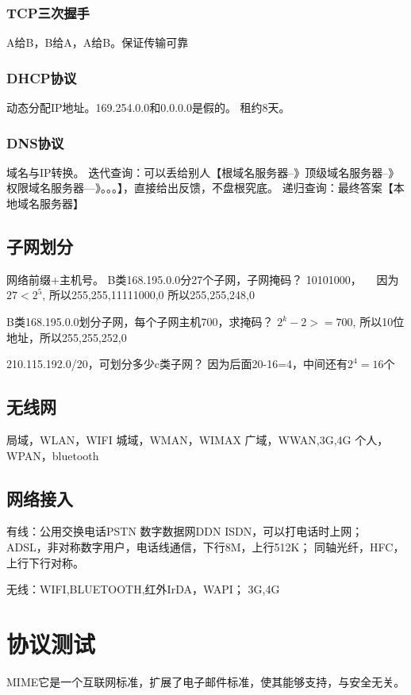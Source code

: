 \documentclass[UTF8]{../computerUniverse}
\begin{document}
\subsubsection{TCP三次握手}
A给B，B给A，A给B。保证传输可靠

\subsubsection{DHCP协议}
动态分配IP地址。169.254.0.0和0.0.0.0是假的。
租约8天。
\subsubsection{DNS协议}
域名与IP转换。
迭代查询：可以丢给别人【根域名服务器--》顶级域名服务器--》权限域名服务器---》。。。】，直接给出反馈，不盘根究底。
递归查询：最终答案【本地域名服务器】


\subsection{子网划分}
网络前缀+主机号。
B类168.195.0.0分27个子网，子网掩码？
10101000，~~
因为$27<2^5$,
所以255,255,11111000,0
所以255,255,248,0

B类168.195.0.0划分子网，每个子网主机700，求掩码？
$2^k-2>=700$, 所以10位地址，所以255,255,252,0


210.115.192.0/20，可划分多少c类子网？
因为后面20-16=4，中间还有$2^4=16$个

\subsection{无线网}
局域，WLAN，WIFI
城域，WMAN，WIMAX
广域，WWAN,3G,4G
个人，WPAN，bluetooth

\subsection{网络接入}
有线：公用交换电话PSTN
数字数据网DDN 
ISDN，可以打电话时上网；
ADSL，非对称数字用户，电话线通信，下行8M，上行512K；
同轴光纤，HFC，上行下行对称。

无线：WIFI,BLUETOOTH,红外IrDA，WAPI；
3G,4G







\section{协议测试}
MIME它是一个互联网标准，扩展了电子邮件标准，使其能够支持，与安全无关。
\end{document}
